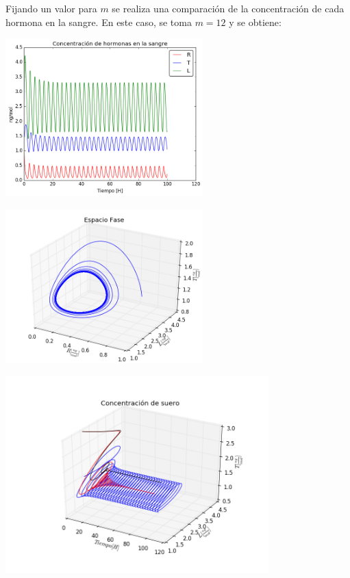 \documentclass[letter,11pt]{article}
\begin{document}
Fijando un valor para $m$ se realiza una comparación de la concentración de cada hormona en la sangre. En este caso, se toma $m=12$ y se obtiene:

\begin{center}
 \includegraphics[width=3in]{imagenes/Graficas/hormonas1.png}
\end{center}

\begin{center}
 \includegraphics[width=3in]{imagenes/Graficas/hormonas2.png}
\end{center}

\newpage

\begin{center}
 \includegraphics[width=4in]{imagenes/Graficas/g3_3D.png}
\end{center}
\end{document}
